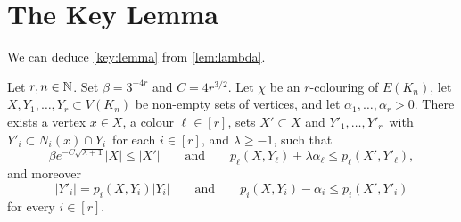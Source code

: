 
\section{The Key Lemma}


We can deduce \autoref{key:lemma} from \autoref{lem:lambda}.

\begin{lemma}
  \label{lem:key-lemma} %
  Let \(r, n\in\mathbb{N}\). Set \(\beta = 3^{-4r}\) and \(C = 4r^{3/2}\).
  Let \(\chi\) be an \(r\)-colouring of \(E(K_n)\), let \(X,Y_1,\ldots,Y_r \subset V(K_n)\) be non-empty sets of vertices, and let \(\alpha_1,\ldots,\alpha_r > 0\). There exists a vertex \(x \in X\), a colour \(\ell \in [r]\), sets \(X' \subset X\) and \(Y'_1,\ldots,Y'_r\,\) with \(Y'_i \subset N_i(x) \cap Y_i\,\) for each \(i \in [r]\), and \(\lambda \ge -1\), such that
  \begin{equation}\label{eq:key:ell}
    \beta e^{- C \sqrt{\lambda + 1}} |X| \le |X'| \qquad \text{and} \qquad p_\ell(X,Y_\ell) + \lambda \alpha_\ell \le p_\ell( X', Y'_\ell ) ,
  \end{equation}
  and moreover
  \begin{equation}\label{eq:key:alli}
    |Y'_i| = p_i(X,Y_i) |Y_i| \qquad \text{and} \qquad  p_i(X,Y_i) - \alpha_i \le p_i( X', Y'_i )
  \end{equation}
  for every \(i \in [r]\).
\end{lemma}
%
